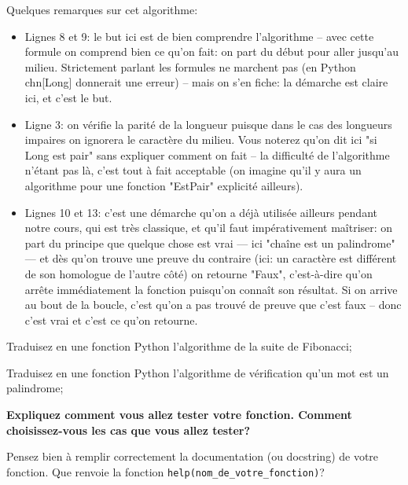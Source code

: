 \documentclass[12pt]{article}
\begin{document}
\begin{MaReponse}
\begin{alphenum}
\begin{algorithmic}[1]
				\State{}
				\EndIf
				\EndFor
				\State{}
				\EndFunction
			\end{algorithmic}
			Quelques remarques sur cet algorithme:
			\begin{itemize}
				\item Lignes 8 et 9: le but ici est de bien comprendre l'algorithme -- avec cette formule on comprend bien ce qu'on fait: on part du début pour aller jusqu'au milieu. Strictement parlant les formules ne marchent pas (en Python chn[Long] donnerait une erreur) -- mais on s'en fiche: la démarche est claire ici, et c'est le but.
				\item Ligne 3: on vérifie la parité de la longueur puisque dans le cas des longueurs impaires on ignorera le caractère du milieu. Vous noterez qu'on dit ici "si Long est pair" sans expliquer comment on fait -- la difficulté de l'algorithme n'étant pas là, c'est tout à fait acceptable (on imagine qu'il y aura un algorithme pour une fonction "EstPair" explicité ailleurs).
				\item Lignes 10 et 13: c'est une démarche qu'on a déjà utilisée ailleurs pendant notre cours, qui est très classique, et qu'il faut impérativement maîtriser: on part du principe que quelque chose est vrai --- ici "chaîne est un palindrome" --- et dès qu'on trouve une preuve du contraire (ici: un caractère est différent de son homologue de l'autre côté) on retourne "Faux", c'est-à-dire qu'on arrête immédiatement la fonction puisqu'on connaît son résultat. Si on arrive au bout de la boucle, c'est qu'on a pas trouvé de preuve que c'est faux -- donc c'est vrai et c'est ce qu'on retourne.
			\end{itemize}
		\end{alphenum}
	\end{MaReponse}
	
	\begin{MonExo}
		\begin{alphenum}
			\item Traduisez en une fonction Python l'algorithme de la suite de Fibonacci;
			\item Traduisez en une fonction Python l'algorithme de vérification qu'un mot est un palindrome;
			\item \textbf{Expliquez comment vous allez tester votre fonction. Comment choisissez-vous les cas que vous allez tester?}
		\end{alphenum}
		\vspace{\baselineskip}
		Pensez bien à remplir correctement la documentation (ou docstring) de votre fonction. Que renvoie la fonction \texttt{help(nom\_de\_votre\_fonction)}?
	\end{MonExo}
	
\end{document}
